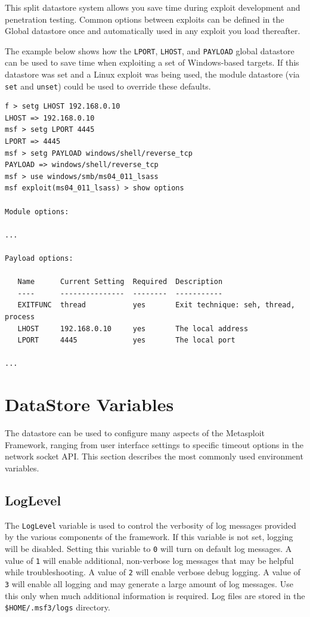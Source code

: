 \documentclass{report}
\begin{document}
\par
This split datastore system allows you save time during exploit development
and penetration testing. Common options between exploits can be defined in the
Global datastore once and automatically used in any exploit you load thereafter.

\par
The example below shows how the \texttt{LPORT}, \texttt{LHOST}, and
\texttt{PAYLOAD} global datastore can be used to save time when exploiting a set
of Windows-based targets. If this datastore was set and a Linux exploit was
being used, the module datastore (via \texttt{set} and \texttt{unset}) could be
used to override these defaults.

{\footnotesize
\begin{verbatim}
f > setg LHOST 192.168.0.10
LHOST => 192.168.0.10
msf > setg LPORT 4445
LPORT => 4445
msf > setg PAYLOAD windows/shell/reverse_tcp
PAYLOAD => windows/shell/reverse_tcp
msf > use windows/smb/ms04_011_lsass
msf exploit(ms04_011_lsass) > show options

Module options:

...

Payload options:

   Name      Current Setting  Required  Description
   ----      ---------------  --------  -----------
   EXITFUNC  thread           yes       Exit technique: seh, thread, process
   LHOST     192.168.0.10     yes       The local address
   LPORT     4445             yes       The local port

...

\end{verbatim}}

    \section{DataStore Variables}
    \label{ENV-VAR}

\par
The datastore can be used to configure many aspects of the Metasploit Framework,
ranging from user interface settings to specific timeout options in the network
socket API. This section describes the most commonly used environment variables.

	\subsection{LogLevel}

\par
The \texttt{LogLevel} variable is used to control the verbosity of log messages
provided by the various components of the framework. If this variable is not
set, logging will be disabled. Setting this variable to \texttt{0} will turn on
default log messages. A value of \texttt{1} will enable additional, non-verbose
log messages that may be helpful while troubleshooting. A value of \texttt{2}
will enable verbose debug logging. A value of \texttt{3} will enable all logging
and may generate a large amount of log messages. Use this only when much
additional information is required. Log files are stored in the
\texttt{\$HOME/.msf3/logs} directory.
\end{document}
